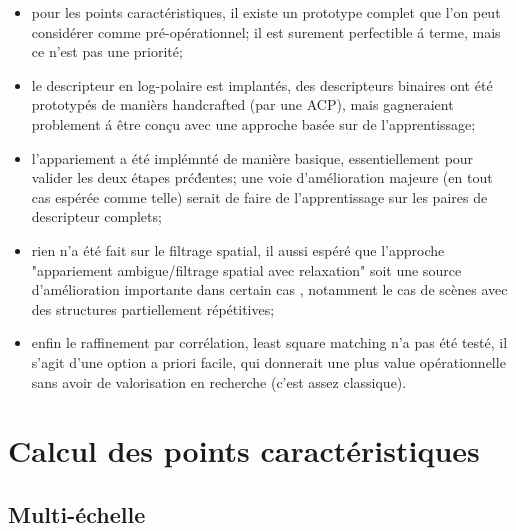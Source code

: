 \begin{itemize}
   \item pour les points caract\'eristiques, il existe un prototype complet que l'on peut consid\'erer comme 
         pr\'e-op\'erationnel; il est surement perfectible \'a terme, mais ce n'est pas une priorit\'e; 

   \item le descripteur en log-polaire est implant\'es, des descripteurs binaires ont \'et\'e prototyp\'es de
         mani\`ers handcrafted (par une ACP),  mais gagneraient problement \'a \^etre con\c{c}u avec une 
         approche bas\'ee sur de l'apprentissage;

   \item l'appariement a \'et\'e impl\'emnt\'e de mani\`ere basique, essentiellement pour valider les deux
         \'etapes pr\'c\'dentes;  une voie d'am\'elioration majeure (en tout cas esp\'er\'ee comme telle)
         serait de faire de l'apprentissage sur les paires de descripteur complets;

   \item rien n'a \'et\'e fait sur le filtrage spatial, il aussi esp\'er\'e  que l'approche 
         "appariement ambigue/filtrage spatial avec relaxation" soit une source d'am\'elioration importante
         dans certain cas , notamment le cas de sc\`enes avec des structures partiellement r\'ep\'etitives;

   \item enfin le raffinement par corr\'elation, least square matching n'a pas \'et\'e test\'e, il s'agit
         d'une option a priori facile, qui donnerait une plus value op\'erationnelle sans avoir de valorisation
         en recherche (c'est assez classique).

\end{itemize}



\section{Calcul des points caract\'eristiques}


\subsection{Multi-\'echelle}

